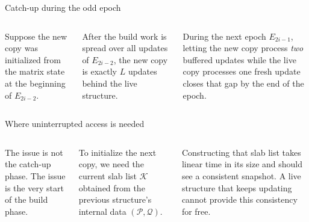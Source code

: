 \documentclass[aspectratio=169,professionalfonts]{beamer}
\newcommand{\cK}{\mathcal{K}}
\newcommand{\cP}{\mathcal{P}}
\newcommand{\cQ}{\mathcal{Q}}
\begin{document}
\begin{frame}[t]{Catch-up during the odd epoch}
\begin{columns}[T,totalwidth=\textwidth]
Suppose the new copy was initialized from the matrix state at the beginning of $E_{2i-2}$.
\medskip

After the build work is spread over all updates of $E_{2i-2}$, the new copy is exactly $L$ updates behind the live structure.
\medskip

During the next epoch $E_{2i-1}$, letting the new copy process \emph{two} buffered updates while the live copy processes one fresh update closes that gap by the end of the epoch.
\centering
{}
\end{columns}
\end{frame}

\begin{frame}[t]{Where uninterrupted access is needed}
\begin{columns}[T,totalwidth=\textwidth]
The issue is not the catch-up phase. The issue is the very start of the build phase.
\medskip

To initialize the next copy, we need the current slab list $\cK$ obtained from the previous structure's internal data $(\cP,\cQ)$.
\medskip

Constructing that slab list takes linear time in its size and should see a consistent snapshot. A live structure that keeps updating cannot provide this consistency for free.
\centering
{}
\end{columns}
\end{frame}
\end{document}
